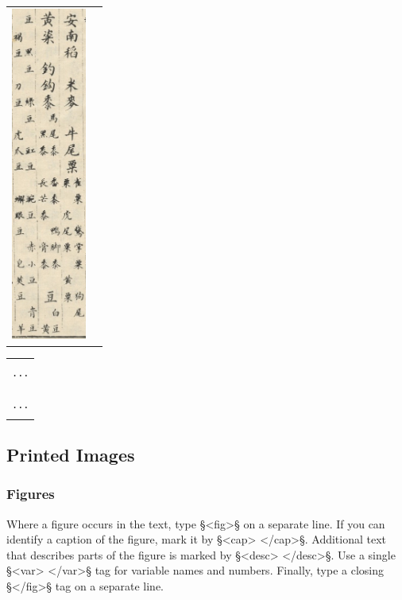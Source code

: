 \documentclass[fontsize=11pt, paper=a4, 
DIV15,
headings=normal,
parskip=half-, 
numbers=noenddot]{scrartcl}
\makeatletter
\newenvironment{typeChinese}{\begin{alltt}\s\begin{tabular}{@{}l}}{\end{tabular}\end{alltt}}
\newcommand{\chin}[1]{{\fontspec{Sun-ExtA}{#1}}}
\newcommand{\f}[1]{\bold{#1}} %
\newcommand{\z}[1]{\chin{#1}} %
\makeatother
\begin{document}
\begin{tabular}{@{}ll}
\includegraphics[height=11cm]{text17-1p7}
\end{tabular}

\vspace{-33mm}
\begin{typeChinese}
\f{<toc>} \\
... \\
\z{安南稻　米麥　牛尾粟}\f{<sm>}\z{雀粟　鵞掌粟　狗尾}\f{\bs\bs}\z{粟　虎尾粟　}\f{<}\z{黄}\f{V>}\z{粟}\f{</sm>} \\
\z{黄粢　釣鈎黍}\f{<sm>}\z{馬尾黍　番黍　鴨脚黍}\f{\bs\bs}\z{　黑黍　長}\f{<}\z{芒}\f{R>}\z{黍　膏黍}\f{</sm>}\z{　豆}\f{<sm>}\z{白豆}\f{\bs\bs}\z{　黄} \\
\z{豆　黑豆　綠豆　豇豆　豌豆　赤小豆　青豆}\f{\bs\bs}\z{　褐豆　刀豆　虎爪豆　蠏眼豆　皂}\f{<}\z{莢}\f{R>}\z{豆　羊} \\
... \f{</sm>} \\
\f{</toc>} \\
\end{typeChinese}


\tocspace
\subsection{Printed Images}


\subsubsection{Figures}
\label{section chinese figures}

\begin{mainrule}
Where a figure occurs in the text, type §<fig>§ on a separate line. If you can identify a caption of the figure, mark it by §<cap> </cap>§. Additional text that describes parts of the figure is marked by §<desc> </desc>§. Use a single §<var> </var>§ tag for variable names and numbers. Finally, type a closing §</fig>§ tag on a separate line.
\end{mainrule}
\end{document}
